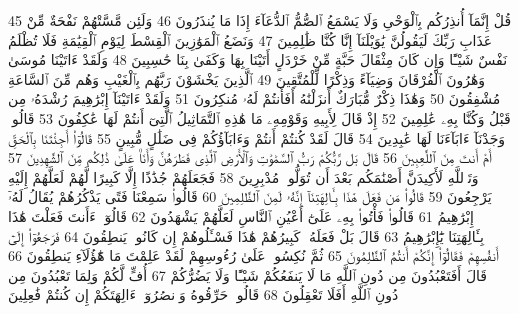 {\tiny\colorbox{cl_aya}{45}} قُلْ إِنَّمَآ أُنذِرُكُم بِٱلْوَحْىِ وَلَا يَسْمَعُ ٱلصُّمُّ ٱلدُّعَآءَ إِذَا مَا يُنذَرُونَ
{\tiny\colorbox{cl_aya}{46}} وَلَئِن مَّسَّتْهُمْ نَفْحَةٌ مِّنْ عَذَابِ رَبِّكَ لَيَقُولُنَّ يَٰوَيْلَنَآ إِنَّا كُنَّا ظَٰلِمِينَ
{\tiny\colorbox{cl_aya}{47}} وَنَضَعُ ٱلْمَوَٰزِينَ ٱلْقِسْطَ لِيَوْمِ ٱلْقِيَٰمَةِ فَلَا تُظْلَمُ نَفْسٌ شَيْـًٔا وَإِن كَانَ مِثْقَالَ حَبَّةٍ مِّنْ خَرْدَلٍ أَتَيْنَا بِهَا وَكَفَىٰ بِنَا حَٰسِبِينَ
{\tiny\colorbox{cl_aya}{48}} وَلَقَدْ ءَاتَيْنَا مُوسَىٰ وَهَٰرُونَ ٱلْفُرْقَانَ وَضِيَآءً وَذِكْرًا لِّلْمُتَّقِينَ
{\tiny\colorbox{cl_aya}{49}} ٱلَّذِينَ يَخْشَوْنَ رَبَّهُم بِٱلْغَيْبِ وَهُم مِّنَ ٱلسَّاعَةِ مُشْفِقُونَ
{\tiny\colorbox{cl_aya}{50}} وَهَٰذَا ذِكْرٌ مُّبَارَكٌ أَنزَلْنَٰهُ أَفَأَنتُمْ لَهُۥ مُنكِرُونَ
{\tiny\colorbox{cl_aya}{51}} وَلَقَدْ ءَاتَيْنَآ إِبْرَٰهِيمَ رُشْدَهُۥ مِن قَبْلُ وَكُنَّا بِهِۦ عَٰلِمِينَ
{\tiny\colorbox{cl_aya}{52}} إِذْ قَالَ لِأَبِيهِ وَقَوْمِهِۦ مَا هَٰذِهِ ٱلتَّمَاثِيلُ ٱلَّتِىٓ أَنتُمْ لَهَا عَٰكِفُونَ
{\tiny\colorbox{cl_aya}{53}} قَالُوا۟ وَجَدْنَآ ءَابَآءَنَا لَهَا عَٰبِدِينَ
{\tiny\colorbox{cl_aya}{54}} قَالَ لَقَدْ كُنتُمْ أَنتُمْ وَءَابَآؤُكُمْ فِى ضَلَٰلٍ مُّبِينٍ
{\tiny\colorbox{cl_aya}{55}} قَالُوٓا۟ أَجِئْتَنَا بِٱلْحَقِّ أَمْ أَنتَ مِنَ ٱللَّٰعِبِينَ
{\tiny\colorbox{cl_aya}{56}} قَالَ بَل رَّبُّكُمْ رَبُّ ٱلسَّمَٰوَٰتِ وَٱلْأَرْضِ ٱلَّذِى فَطَرَهُنَّ وَأَنَا۠ عَلَىٰ ذَٰلِكُم مِّنَ ٱلشَّٰهِدِينَ
{\tiny\colorbox{cl_aya}{57}} وَتَٱللَّهِ لَأَكِيدَنَّ أَصْنَٰمَكُم بَعْدَ أَن تُوَلُّوا۟ مُدْبِرِينَ
{\tiny\colorbox{cl_aya}{58}} فَجَعَلَهُمْ جُذَٰذًا إِلَّا كَبِيرًا لَّهُمْ لَعَلَّهُمْ إِلَيْهِ يَرْجِعُونَ
{\tiny\colorbox{cl_aya}{59}} قَالُوا۟ مَن فَعَلَ هَٰذَا بِـَٔالِهَتِنَآ إِنَّهُۥ لَمِنَ ٱلظَّٰلِمِينَ
{\tiny\colorbox{cl_aya}{60}} قَالُوا۟ سَمِعْنَا فَتًى يَذْكُرُهُمْ يُقَالُ لَهُۥٓ إِبْرَٰهِيمُ
{\tiny\colorbox{cl_aya}{61}} قَالُوا۟ فَأْتُوا۟ بِهِۦ عَلَىٰٓ أَعْيُنِ ٱلنَّاسِ لَعَلَّهُمْ يَشْهَدُونَ
{\tiny\colorbox{cl_aya}{62}} قَالُوٓا۟ ءَأَنتَ فَعَلْتَ هَٰذَا بِـَٔالِهَتِنَا يَٰٓإِبْرَٰهِيمُ
{\tiny\colorbox{cl_aya}{63}} قَالَ بَلْ فَعَلَهُۥ كَبِيرُهُمْ هَٰذَا فَسْـَٔلُوهُمْ إِن كَانُوا۟ يَنطِقُونَ
{\tiny\colorbox{cl_aya}{64}} فَرَجَعُوٓا۟ إِلَىٰٓ أَنفُسِهِمْ فَقَالُوٓا۟ إِنَّكُمْ أَنتُمُ ٱلظَّٰلِمُونَ
{\tiny\colorbox{cl_aya}{65}} ثُمَّ نُكِسُوا۟ عَلَىٰ رُءُوسِهِمْ لَقَدْ عَلِمْتَ مَا هَٰٓؤُلَآءِ يَنطِقُونَ
{\tiny\colorbox{cl_aya}{66}} قَالَ أَفَتَعْبُدُونَ مِن دُونِ ٱللَّهِ مَا لَا يَنفَعُكُمْ شَيْـًٔا وَلَا يَضُرُّكُمْ
{\tiny\colorbox{cl_aya}{67}} أُفٍّ لَّكُمْ وَلِمَا تَعْبُدُونَ مِن دُونِ ٱللَّهِ أَفَلَا تَعْقِلُونَ
{\tiny\colorbox{cl_aya}{68}} قَالُوا۟ حَرِّقُوهُ وَٱنصُرُوٓا۟ ءَالِهَتَكُمْ إِن كُنتُمْ فَٰعِلِينَ
